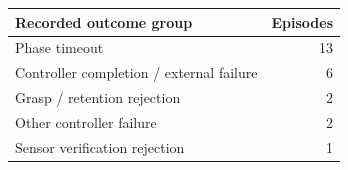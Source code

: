 \begin{tabular}{lr}
\toprule
Recorded outcome group & Episodes \\
\midrule
Phase timeout & 13 \\
Controller completion / external failure & 6 \\
Grasp / retention rejection & 2 \\
Other controller failure & 2 \\
Sensor verification rejection & 1 \\
\bottomrule
\end{tabular}
